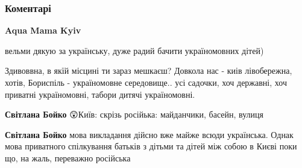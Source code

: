  
 
 
 
 
\subsubsection{Коментарі}
\label{sec:30_07_2021.fb.vdovichenko_andrej.1.deti_jazyk.cmt}

\begin{itemize}
 
\textbf{Aqua Mama Kyiv} 

вельми дякую за українську, дуже радий бачити україномовних дітей)


 

Здивоввна, в якїй місцині ти зараз мешкаєш? Довкола нас - киів лівобережна,
хотів, Бориспіль - україномовне середовище.. усі садочки, хоч державні, хоч
приватні україномовні, табори дитячі україномовні.

\begin{itemize}
 
\textbf{Світлана Бойко} 😲Київ: скрізь російька: майданчики, басейн, вулиця

 
\textbf{Світлана Бойко} мова викладання дійсно вже майже всюди українська. Однак мова приватного спілкування батьків з дітьми та дітей між собою в Києві поки що, на жаль, переважно російська
\end{itemize}


\end{itemize}
